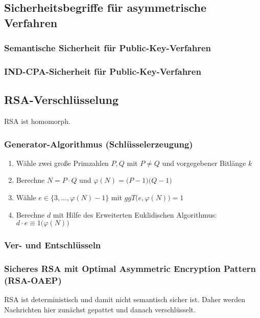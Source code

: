 \subsection{Sicherheitsbegriffe für asymmetrische Verfahren}

\subsubsection{Semantische Sicherheit für Public-Key-Verfahren}

\subsubsection{IND-CPA-Sicherheit für Public-Key-Verfahren}

\subsection{RSA-Verschlüsselung}
RSA ist homomorph.

\subsubsection{Generator-Algorithmus (Schlüsselerzeugung)}
\begin{enumerate}
	\item Wähle zwei große Primzahlen \(P,Q\) mit \(P \neq Q\) und vorgegebener Bitlänge \(k\)
	\item Berechne \(N = P \cdot Q\) und \(\varphi(N) = \big(P-1\big)\big(Q-1\big)\)
	\item Wähle \(e \in \{3,\ldots,\varphi(N)-1\}\) mit \(ggT\big(e, \varphi(N)\big) = 1\)
	\item Berechne \(d\) mit Hilfe des Erweiterten Euklidischen Algorithmus: \(d \cdot e \equiv 1 \big(\varphi(N)\big)\)
\end{enumerate}

\subsubsection{Ver- und Entschlüsseln}

\subsubsection{Sicheres RSA mit Optimal Asymmetric Encryption Pattern (RSA-OAEP)}
RSA ist deterministisch und damit nicht semantisch sicher ist. Daher werden Nachrichten hier zunächst gepattet und danach verschlüsselt. 

